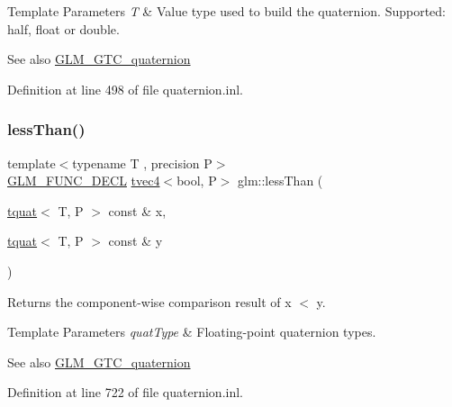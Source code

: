 \begin{DoxyTemplParams}{Template Parameters}
{\em T} & Value type used to build the quaternion. Supported\+: half, float or double. \\
\hline
\end{DoxyTemplParams}
\begin{DoxySeeAlso}{See also}
\mbox{\hyperlink{group__gtc__quaternion}{G\+L\+M\+\_\+\+G\+T\+C\+\_\+quaternion}} 
\end{DoxySeeAlso}


Definition at line 498 of file quaternion.\+inl.

\mbox{\label{group__gtc__quaternion_ga91a40d16a3b5bb47d71ac1a3fb688ffa}} 
\subsubsection{\texorpdfstring{lessThan()}{lessThan()}}
{\footnotesize\ttfamily template$<$typename T , precision P$>$ \\
\mbox{\hyperlink{setup_8hpp_ab2d052de21a70539923e9bcbf6e83a51}{G\+L\+M\+\_\+\+F\+U\+N\+C\+\_\+\+D\+E\+CL}} \mbox{\hyperlink{structglm_1_1tvec4}{tvec4}}$<$bool, P$>$ glm\+::less\+Than (\begin{DoxyParamCaption}\item[{\mbox{\hyperlink{structglm_1_1tquat}{tquat}}$<$ T, P $>$ const \&}]{x,  }\item[{\mbox{\hyperlink{structglm_1_1tquat}{tquat}}$<$ T, P $>$ const \&}]{y }\end{DoxyParamCaption})}

Returns the component-\/wise comparison result of x $<$ y.


\begin{DoxyTemplParams}{Template Parameters}
{\em quat\+Type} & Floating-\/point quaternion types.\\
\hline
\end{DoxyTemplParams}
\begin{DoxySeeAlso}{See also}
\mbox{\hyperlink{group__gtc__quaternion}{G\+L\+M\+\_\+\+G\+T\+C\+\_\+quaternion}} 
\end{DoxySeeAlso}


Definition at line 722 of file quaternion.\+inl.

\mbox{\label{group__gtc__quaternion_ga7c81996ed2724f26fe76faf352c76294}} 
